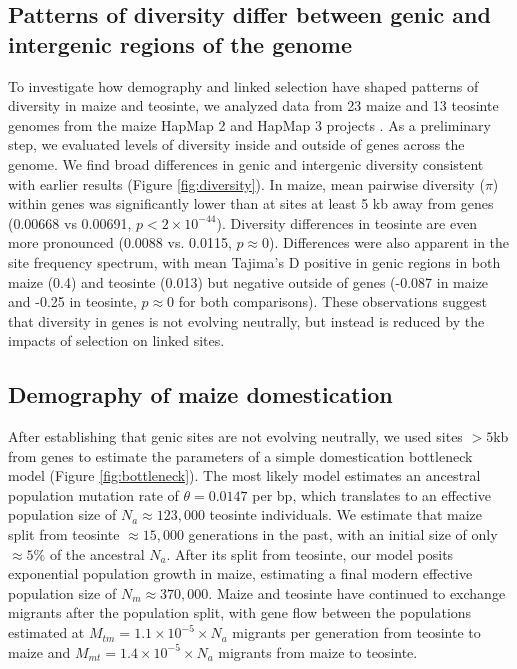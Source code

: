 \documentclass[twoside, twocolumn, letterpaper]{article}
\begin{document}
\subsection*{Patterns of diversity differ between genic and  intergenic regions of the genome} %
To investigate how demography and linked selection have shaped patterns of diversity in maize and teosinte, we analyzed data from 23 maize and 13 teosinte genomes from the maize HapMap 2 and HapMap 3 projects \cite{chia2012, bukowski2015}. As a preliminary step, we evaluated levels of diversity inside and outside of genes across the genome. We find broad differences in genic and intergenic diversity consistent with earlier results  \cite{hufford2012}(Figure \ref{fig:diversity}).  In maize, mean pairwise diversity ($\pi$) within genes was significantly lower than at sites at least 5 kb away from genes (0.00668 vs 0.00691, $p<2\times 10^{-44}$). 
Diversity differences in teosinte are even more pronounced (0.0088 vs. 0.0115, $p\approx 0$). 
Differences were also apparent in the site frequency spectrum, with mean Tajima's D positive in genic regions in both maize (0.4) and teosinte (0.013) but negative outside of genes (-0.087 in maize and -0.25 in teosinte, $p\approx 0$ for both comparisons).
These observations suggest that diversity in genes is not evolving neutrally, but instead is reduced by the impacts of selection on linked sites. 



\subsection*{Demography of maize domestication} %
After establishing that genic sites are not evolving neutrally, we used sites $>5$kb from genes to estimate the parameters of a simple domestication bottleneck model  (Figure \ref{fig:bottleneck}). 
The most likely model estimates an ancestral population mutation rate of $\theta=0.0147$ per bp, which translates to an effective population size of $N_a \approx 123,000$ teosinte individuals.
We estimate that maize split from teosinte $\approx 15,000$ generations in the past, with an initial size of only $\approx 5\% $ of the ancestral $N_a$. 
After its split from teosinte, our model posits exponential population growth in maize, estimating a final modern effective population size of $N_m \approx 370,000$.
Maize and teosinte have continued to exchange migrants after the population split, with gene flow between the populations estimated at $M_{tm} =  1.1 \times 10^{-5} \times N_a $  migrants per generation from teosinte to maize and $M_{mt} =  1.4 \times 10^{-5} \times N_a$ migrants from maize to teosinte. 
\end{document}

